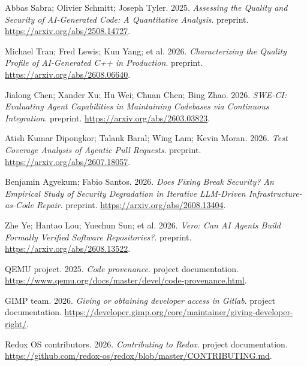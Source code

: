 {\begin{description}[leftmargin=2em,labelwidth=1.5em,itemsep=1pt,parsep=0pt]
\item[39.] \hypertarget{ref-sabra2025}{} Abbas Sabra; Olivier Schmitt; Joseph Tyler. 2025. \textit{Assessing the Quality and Security of AI-Generated Code: A Quantitative Analysis}. preprint. \url{https://arxiv.org/abs/2508.14727}.

\item[40.] \hypertarget{ref-tran2026}{} Michael Tran; Fred Lewis; Kun Yang; et al. 2026. \textit{Characterizing the Quality Profile of AI-Generated C++ in Production}. preprint. \url{https://arxiv.org/abs/2608.06640}.

\item[41.] \hypertarget{ref-sweci2026}{} Jialong Chen; Xander Xu; Hu Wei; Chuan Chen; Bing Zhao. 2026. \textit{SWE-CI: Evaluating Agent Capabilities in Maintaining Codebases via Continuous Integration}. preprint. \url{https://arxiv.org/abs/2603.03823}.

\item[42.] \hypertarget{ref-coverage2026}{} Atish Kumar Dipongkor; Talank Baral; Wing Lam; Kevin Moran. 2026. \textit{Test Coverage Analysis of Agentic Pull Requests}. preprint. \url{https://arxiv.org/abs/2607.18057}.

\item[43.] \hypertarget{ref-iac2026}{} Benjamin Agyekum; Fabio Santos. 2026. \textit{Does Fixing Break Security? An Empirical Study of Security Degradation in Iterative LLM-Driven Infrastructure-as-Code Repair}. preprint. \url{https://arxiv.org/abs/2608.13404}.

\item[44.] \hypertarget{ref-vero2026}{} Zhe Ye; Hantao Lou; Yuechun Sun; et al. 2026. \textit{Vero: Can AI Agents Build Formally Verified Software Repositories?}. preprint. \url{https://arxiv.org/abs/2608.13522}.

\item[45.] \hypertarget{ref-qemupolicy2026}{} QEMU project. 2025. \textit{Code provenance}. project documentation. \url{https://www.qemu.org/docs/master/devel/code-provenance.html}.

\item[46.] \hypertarget{ref-gimppolicy2026}{} GIMP team. 2026. \textit{Giving or obtaining developer access in Gitlab}. project documentation. \url{https://developer.gimp.org/core/maintainer/giving-developer-right/}.

\item[47.] \hypertarget{ref-redoxpolicy2026}{} Redox OS contributors. 2026. \textit{Contributing to Redox}. project documentation. \url{https://github.com/redox-os/redox/blob/master/CONTRIBUTING.md}.


\end{description}}
